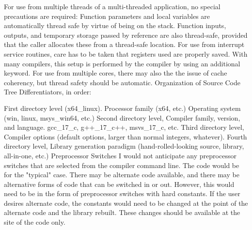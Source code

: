 For use from multiple threads of a multi-threaded application, no special precautions are required:
Function parameters and local variables are automatically thread safe by virtue of being on the stack.
Function inputs, outputs, and temporary storage passed by reference are also thread-safe, provided that the caller allocates these from a thread-safe location.
For use from interrupt service routines, care has to be taken that registers used are properly saved. With many compilers, this setup is performed by the compiler by using an additional keyword.
For use from multiple cores, there may also the the issue of cache coherency, but thread safety should be automatic.
Organization of Source Code Tree
Differentiators, in order:

First directory level (x64\_linux).
Processor family (x64, etc.)
Operating system (win, linux, msys\_win64, etc.)
Second directory level, Compiler family, version, and language.
gcc\_17\_c, g++\_17\_c++, msvs\_17\_c, etc.
Third directory level, Compiler options (default options, larger than normal integers, whatever).
Fourth directory level, Library generation paradigm (hand-rolled-looking source, library, all-in-one, etc.)
Preprocessor Switches
I would not anticipate any preprocessor switches that are selected from the compiler command line. The code would be for the "typical" case. There may be alternate code available, and there may be alternative forms of code that can be switched in or out. However, this would need to be in the form of preprocessor switches with hard constants. If the user desires alternate code, the constants would need to be changed at the point of the alternate code and the library rebuilt. These changes should be available at the site of the code only.

